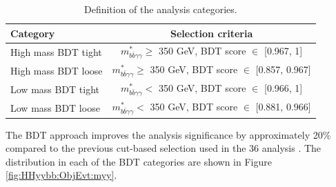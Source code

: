 \begin{table}[htbp]
    \centering
    \begin{tabular}{lc}
    \hline\hline
        Category & Selection criteria \\
    \hline
    High mass BDT tight & $m_{b \bar{b} \gamma \gamma}^{*} \geq$ 350 GeV, BDT score $\in$ [0.967, 1] \\
    High mass BDT loose & $m_{b \bar{b} \gamma \gamma}^{*} \geq$ 350 GeV, BDT score $\in$ [0.857, 0.967] \\
    Low mass BDT tight & $m_{b \bar{b} \gamma \gamma}^{*} <$ 350 GeV, BDT score $\in$ [0.966, 1] \\
    Low mass BDT loose & $m_{b \bar{b} \gamma \gamma}^{*} <$ 350 GeV, BDT score $\in$ [0.881, 0.966] \\
     \hline\hline
    \end{tabular}
    \caption{Definition of the analysis categories.}
    \label{tab:HHyybb:ObjEvt:Evt:Cat}
\end{table}
The BDT approach improves the analysis significance by approximately 20\% compared to the previous cut-based selection used in the 36 \ifb analysis \cite{yybb_36ifb}. The \myy distribution in each of the BDT categories are shown in Figure \ref{fig:HHyybb:ObjEvt:myy}. \\ 
